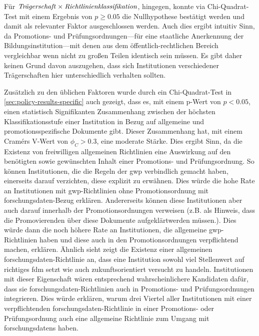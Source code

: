 Für $\text{\textit{Trägerschaft}}\times\text{\textit{Richtlinienklassifikation}}$, hingegen, konnte via Chi-Quadrat-Test mit einem Ergebnis von $p\geqslant\num{0,05}$ die Nullhypothese bestätigt werden und damit als relevanter Faktor ausgeschlossen werden.
Auch dies ergibt intuitiv Sinn, da Promotions- und Prüfungsordnungen---für eine staatliche Anerkennung der Bildungsinstitution---mit denen aus dem öffentlich-rechtlichen Bereich vergleichbar wenn nicht zu großen Teilen identisch sein müssen.
Es gibt daher keinen Grund davon auszugehen, dass sich Institutionen verschiedener Trägerschaften hier unterschiedlich verhalten sollten.

Zusätzlich zu den üblichen Faktoren wurde durch ein Chi-Quadrat-Test in \cref{sec:policy-results-specific} auch gezeigt, dass es, mit einem p-Wert von $p<\num{0,05}$, einen statistisch Signifikanten Zusammenhang zwischen der höchsten Klassifikationsstufe einer Institution in Bezug auf allgemeine und promotionsspezifische Dokumente gibt.
Dieser Zusammenhang hat, mit einem Cramérs V-Wert von $\phi_C>\num{0.3}$, eine moderate Stärke.
Dies ergibt Sinn, da die Existenz von freiwilligen allgemeinen Richtlinien eine Auswirkung auf den benötigten sowie gewünschten Inhalt einer Promotions- und Prüfungsordnung.
So können Institutionen, die die Regeln der \gls{gwp} verbindlich gemacht haben, einerseits darauf verzichten, diese explizit zu erwähnen.
Dies würde die hohe Rate an Institutionen mit \gls{gwp}-Richtlinien ohne Promotionsordnung mit \gls{forschungsdaten}-Bezug erklären.
Andererseits können diese Institutionen aber auch darauf innerhalb der Promotionsordnungen verweisen (z.B. als Hinweis, dass die Promovierenden über diese Dokumente aufgeklärtwerden müssen.).
Dies würde dann die noch höhere Rate an Institutionen, die allgemeine \gls{gwp}-Richtlinien haben und diese auch in den Promotionsordnungen verpflichtend machen, erklären.
Ähnlich sieht zeigt die Existenz einer allgemeinen \gls{forschungsdaten}-Richtlinie an, dass eine Institution sowohl viel Stellenwert auf richtiges \gls{fdm} setzt wie auch zukunftsorientiert versucht zu handeln.
Institutionen mit dieser Eigenschaft wären entsprechend wahrscheinlichere Kandidaten dafür, dass sie \gls{forschungsdaten}-Richtlinien auch in Promotions- und Prüfungsordnungen integrieren.
Dies würde erklären, warum drei Viertel aller Institutionen mit einer verpflichtenden \gls{forschungsdaten}-Richtlinie in einer Promotions- oder Prüfungsordnung auch eine allgemeine Richtlinie zum Umgang mit \glspl{forschungsdaten} haben.